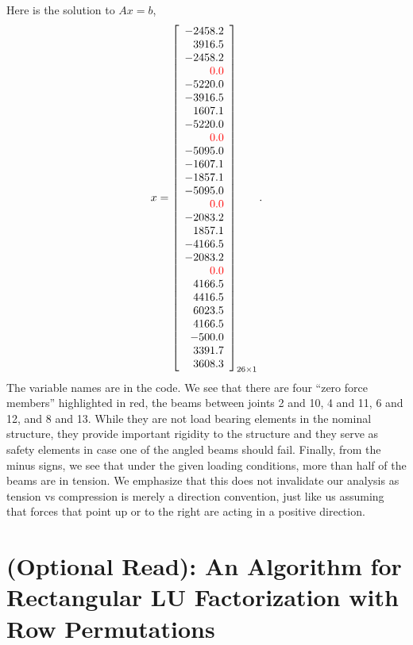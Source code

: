 \vspace*{.2cm}
Here is the solution to $Ax=b$,
\begin{equation}
x=\left[
\begin{array}{r}
-2458.2 \\
3916.5 \\
-2458.2 \\
\color{red} 0.0 \\
-5220.0 \\
-3916.5 \\
1607.1 \\
-5220.0 \\
\color{red} 0.0 \\
-5095.0 \\
-1607.1 \\
-1857.1 \\
-5095.0 \\
\color{red} 0.0 \\
-2083.2 \\
1857.1 \\
-4166.5 \\
-2083.2 \\
\color{red} 0.0 \\
4166.5 \\
4416.5 \\
6023.5 \\
4166.5 \\
-500.0 \\
3391.7 \\
3608.3 \\
\end{array}
\right]_{26 \times 1}.
\end{equation}
The variable names are in the code. We see that there are four ``zero force members'' highlighted in red, the beams between joints 2 and 10, 4 and 11, 6 and 12, and 8 and 13. While they are not load bearing elements in the nominal structure, they provide important rigidity to the structure and they serve as safety elements in case one of the angled beams should fail. Finally, from the minus signs, we see that under the given loading conditions, more than half of the beams are in tension. We emphasize that this does not invalidate our analysis as tension vs compression is merely a direction convention, just like us assuming that forces that point up or to the right are acting in a positive direction. 

\section{(Optional Read): An Algorithm for Rectangular LU Factorization with Row Permutations}
\label{sec:rectangularLU}

